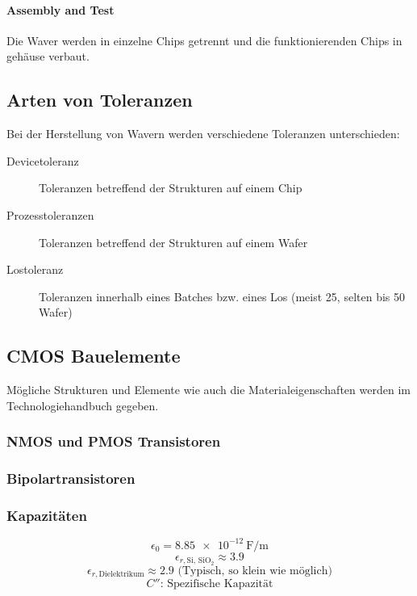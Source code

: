 \paragraph{Assembly and Test}
Die Waver werden in einzelne Chips getrennt und die funktionierenden Chips in gehäuse verbaut.

\subsection{Arten von Toleranzen}
Bei der Herstellung von Wavern werden verschiedene Toleranzen unterschieden:
\begin{description}
    \item[Devicetoleranz] Toleranzen betreffend der Strukturen auf einem Chip
    \item[Prozesstoleranzen] Toleranzen betreffend der Strukturen auf einem Wafer
    \item[Lostoleranz] Toleranzen innerhalb eines Batches bzw. eines Los (meist 25, selten bis 50 Wafer)
\end{description}

\subsection{CMOS Bauelemente}
Mögliche Strukturen und Elemente wie auch die Materialeigenschaften werden im Technologiehandbuch gegeben.

\subsubsection{NMOS und PMOS Transistoren}
\begin{center}
    
\end{center}

\subsubsection{Bipolartransistoren}
\begin{center}
    
\end{center}

\subsubsection{Kapazitäten}
\begin{center}
\end{center}
\begin{center}
\end{center}
\[
    \epsilon_0 = \qty{8.85e-12}{\farad\per\meter}
\]
\[
    \epsilon_{r, \text{Si, SiO$_2$}} \approx 3.9
\]
\[
    \epsilon_{r, \text{Dielektrikum}} \approx 2.9 \text{\ (Typisch, so klein wie möglich)}
\]
\[
    C''\text{: Spezifische Kapazität}
\]

